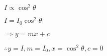 \documentclass[10pt]{book}
\begin{document}
\begin{mdSnippets}
\begin{mdInlineSnippet}[54c828d34a9ab5de03d1bd36d06f8bfe]%
$I\propto\cos^2\theta$\end{mdInlineSnippet}%
\begin{mdInlineSnippet}[3988589845bbb41b96d667f353b3d1bb]%
$I=I_0\cos^2\theta$\end{mdInlineSnippet}%
\begin{mdInlineSnippet}[053a5864c12b37b85c25fc88ddcedfa4]%
$\Rightarrow y=mx+c$\end{mdInlineSnippet}%
\begin{mdInlineSnippet}[65261bf0f42cf0f16dcf6f6742361736]%
$\therefore y=I, m=I_0, x=\cos^2\theta, c=0$\end{mdInlineSnippet}%

\end{mdSnippets}
\end{document}
